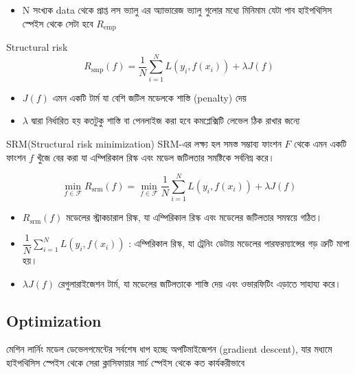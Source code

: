 \documentclass[graybox, envcountchap, twocolumn]{styles/svmult}
\begin{document}
\begin{enumerate}
\begin{definition}
\begin{itemize}
    \item {\bengalifont N সংখ্যক data থেকে প্রাপ্ত লস ভ্যালু এর অ্যাভারেজ ভ্যালু গুলোর মধ্যে মিনিমাম যেটা পাব হাইপথিসিস স্পেইস থেকে সেটা হবে} $R_{\mathrm{emp}}$
\end{itemize}
\end{definition}

\begin{definition}
Structural risk
\begin{equation}
R_{\mathrm{smp}}(f)=\dfrac{1}{N}\sum\limits_{i=1}^{N} L\left(y_i,f(x_i)\right) +\lambda J(f)
\end{equation}
\end{definition}
\begin{itemize}
    \item $J(f)$ {\bengalifont এমন একটি টার্ম যা বেশি জটিল মডেলকে শাস্তি (penalty) দেয় }
    \item  $ \lambda $ {\bengalifont দ্বারা নির্ধারিত হয় কতটুকু শাস্তি বা পেনলাইজ করা হবে কমপ্লেক্সিটি লেভেল ঠিক রাখার জন্যে }
\end{itemize}

\begin{definition}
SRM(Structural risk minimization)
\bengalifont
SRM-এর লক্ষ্য হল সমস্ত সম্ভাব্য ফাংশন $F$ থেকে এমন একটি ফাংশন $f$ খুঁজে বের করা যা এম্পিরিকাল রিস্ক এবং মডেল জটিলতার সমষ্টিকে সর্বনিম্ন করে। 

\begin{equation}
\min\limits _{f \in \mathcal{F}} R_{\mathrm{srm}}(f)=\min\limits _{f \in \mathcal{F}} \dfrac{1}{N}\sum\limits_{i=1}^{N} L\left(y_i,f(x_i)\right) +\lambda J(f)
\end{equation}


\begin{itemize}
    \item $R_{\mathrm{srm}}(f)$ {\bengalifont মডেলের স্ট্রাকচারাল রিস্ক, যা এম্পিরিকাল রিস্ক এবং মডেলের জটিলতার সমন্বয়ে গঠিত।}
    \item $\dfrac{1}{N}\sum\limits_{i=1}^{N} L\left(y_i,f(x_i)\right)$ : {\bengalifont এম্পিরিকাল রিস্ক, যা ট্রেনিং ডেটায় মডেলের পারফরম্যান্সের গড় ত্রুটি মাপা হয়।}
    \item $\lambda J(f)$ {\bengalifont রেগুলারাইজেশন টার্ম, যা মডেলের জটিলতাকে শাস্তি দেয় এবং ওভারফিটিং এড়াতে সাহায্য করে।}
\end{itemize}
\end{definition}


\subsection{Optimization}
\bengalifont
মেশিন লার্নিং মডেল ডেভেলপমেন্টের সর্বশেষ ধাপ হচ্ছে অপটিমাইজেশন (gradient descent), যার মধ্যমে হাইপথিসিস স্পেইস থেকে সেরা ক্লাসিফায়ার সার্চ স্পেইস থেকে কত কার্যকরীভাবে  




\end{enumerate}
\end{document}

